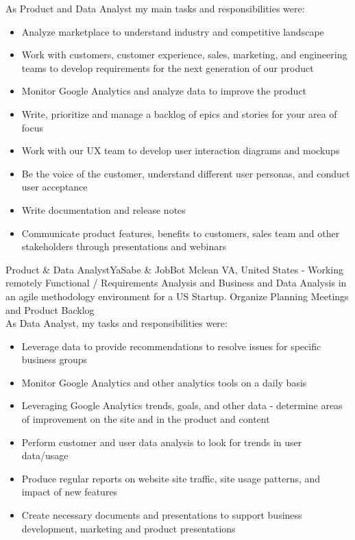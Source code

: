 \documentclass[11pt,a4paper,sans]{moderncv}
\begin{document}
As Product and Data Analyst my main tasks and responsibilities were:
\begin{itemize}
  \item Analyze marketplace to understand industry and competitive landscape
  \item Work with customers, customer experience, sales, marketing, and engineering teams to develop requirements for the next generation of our product
  \item Monitor Google Analytics and analyze data to improve the product
  \item Write, prioritize and manage a backlog of epics and stories for your area of focus
  \item Work with our UX team to develop user interaction diagrams and mockups
  \item Be the voice of the customer, understand different user personas, and conduct user acceptance
  \item Write documentation and release notes
  \item Communicate product features, benefits to customers, sales team and other stakeholders through presentations and webinars
\newline{}
\end{itemize}

 {Product \& Data Analyst}{YaSabe \& JobBot  }{Mclean VA,  United States - Working remotely}{}{}{}
Functional / Requirements Analysis and Business and Data Analysis in an agile methodology environment for a US Startup. Organize Planning Meetings and Product Backlog
\\

As  Data Analyst, my tasks and responsibilities were:
\begin{itemize}
  \item Leverage data to provide recommendations to resolve issues for specific business groups
  \item Monitor Google Analytics and other analytics tools on a daily basis
  \item Leveraging Google Analytics trends, goals, and other data - determine areas of improvement on the site and in the product and content
  \item Perform customer and user data analysis to look for trends in user data/usage
  \item Produce regular reports on website site traffic, site usage patterns, and impact of new features
  \item Create necessary documents and presentations to support business development, marketing and product presentations
\newline
 \end{itemize}
\end{document}
